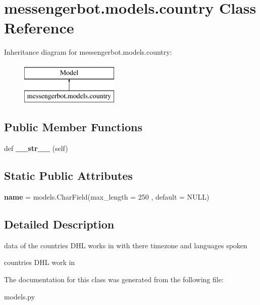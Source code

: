 \hypertarget{classmessengerbot_1_1models_1_1country}{}\section{messengerbot.\+models.\+country Class Reference}
\label{classmessengerbot_1_1models_1_1country}
Inheritance diagram for messengerbot.\+models.\+country\+:\begin{figure}[H]
\begin{center}
\leavevmode
\includegraphics[height=2.000000cm]{classmessengerbot_1_1models_1_1country}
\end{center}
\end{figure}
\subsection*{Public Member Functions}
\begin{DoxyCompactItemize}
\item 
\mbox{\label{classmessengerbot_1_1models_1_1country_a87a737d0996b7e070945370c72839e30}} 
def {\bfseries \+\_\+\+\_\+str\+\_\+\+\_\+} (self)
\end{DoxyCompactItemize}
\subsection*{Static Public Attributes}
\begin{DoxyCompactItemize}
\item 
\mbox{\label{classmessengerbot_1_1models_1_1country_af2e57cfffa2944ef3adbd02f53146fcc}} 
{\bfseries name} = models.\+Char\+Field(max\+\_\+length = 250 , default = \textquotesingle{}N\+U\+LL\textquotesingle{})
\end{DoxyCompactItemize}


\subsection{Detailed Description}
\begin{DoxyVerb}data of the countries DHL works in with there timezone and languages spoken\end{DoxyVerb}
\begin{DoxyVerb}countries DHL work in\end{DoxyVerb}
 

The documentation for this class was generated from the following file\+:\begin{DoxyCompactItemize}
\item 
models.\+py\end{DoxyCompactItemize}
